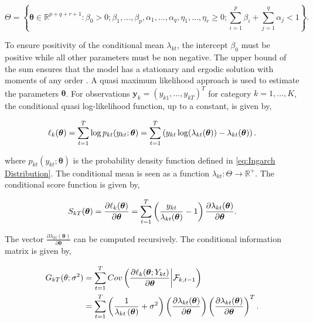 \begin{equation}
\Theta = \left\{ \bm{\theta} \in \mathbb{R}^{p+q+r+1}: \beta_0 > 0; \beta_1,\ldots,\beta_p,\alpha_1,\ldots,\alpha_q,\eta_1,\ldots,\eta_r \geq 0; \sum_{i=1}^p\beta_i + \sum_{j=1}^q\alpha_j < 1 \right\}.
\label{eq:Ingarch parameter space}
\end{equation}

To ensure positivity of the conditional mean $\lambda_{kt}$, the intercept $\beta_0$ must be positive while all other parameters must be non negative. The upper bound of the sum ensures that the model has a stationary and ergodic solution with moments of any order \cite{Ferland:2006,Fokianos:2009,Doukhan:2012}. A quasi maximum likelihood approach is used to estimate the parameters $\bm{\theta}$. 
For observations $\textbf{y}_k = \left(y_{k1},\ldots,y_{kT}\right)^T$ for category $k=1,\ldots,K$, the conditional quasi log-likelihood function, up to a constant, is given by,

\begin{equation}
\ell_k(\bm{\theta}) = \sum_{t=1}^T\log p_{kt}(y_{kt};\bm{\theta}) = \sum_{t=1}^T \left(y_{kt}\log(\lambda_{kt}(\bm{\theta})) - \lambda_{kt}(\bm{\theta})\right).
\label{eq: Quasi log likelihood}
\end{equation}

where $p_{kt}(y_{kt};\bm{\theta})$ is the probability density function defined in \ref{eq:Ingarch Distribution}. The conditional mean is seen as a function $\lambda_{kt}: \Theta \rightarrow \mathbb{R}^{+}$. The conditional score function is given by,

\begin{equation}
S_{kT}(\bm{\theta}) = \frac{\partial \ell_k(\bm{\theta})}{\partial \bm{\theta}} = \sum_{t=1}^T\left(\frac{y_{kt}}{\lambda_{kt}(\bm{\theta})}-1\right)\frac{\partial\lambda_{kt}(\bm{\theta})}{\partial \bm{\theta}}.
\label{eq:conditional score}
\end{equation}

The vector $\frac{\partial\lambda_{kt}(\bm{\theta})}{\partial \bm{\theta}}$ can be computed recursively. 
The conditional information matrix is given by, 

\begin{equation}
\begin{aligned}
G_{kT}(\theta;\sigma^2) &= \sum_{t=1}^T Cov\left(\frac{\partial \ell_k(\bm{\theta}; Y_{kt})}{\partial \bm{\theta}} \middle| \mathcal{F}_{k,t-1}\right) \\
&=  \sum_{t=1}^T \left(\frac{1}{\lambda_{kt}\left(\bm{\theta}\right)}+\sigma^2\right) \left(\frac{\partial \lambda_{kt}(\bm{\theta})}{\partial \bm{\theta}}\right)\left(\frac{\partial \lambda_{kt}(\bm{\theta})}{\partial \bm{\theta}}\right)^T.
\label{eq:conditional information matrix}
\end{aligned}
\end{equation}


